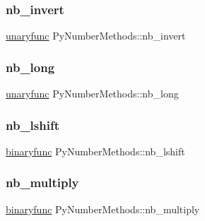 \mbox{\label{struct_py_number_methods_aee32a87f659df88aab41f1f163a106dd}} 
\subsubsection{\texorpdfstring{nb\_invert}{nb\_invert}}
{\footnotesize\ttfamily \mbox{\hyperlink{_python27_2object_8h_aeda2d77a292fdf2c686151d24b3dbf5a}{unaryfunc}} Py\+Number\+Methods\+::nb\+\_\+invert}

\mbox{\label{struct_py_number_methods_aef207975e5fba42dbcf543dadba16268}} 
\subsubsection{\texorpdfstring{nb\_long}{nb\_long}}
{\footnotesize\ttfamily \mbox{\hyperlink{_python27_2object_8h_aeda2d77a292fdf2c686151d24b3dbf5a}{unaryfunc}} Py\+Number\+Methods\+::nb\+\_\+long}

\mbox{\label{struct_py_number_methods_a8d70551ecd98629b8bd17609db59ce75}} 
\subsubsection{\texorpdfstring{nb\_lshift}{nb\_lshift}}
{\footnotesize\ttfamily \mbox{\hyperlink{_python27_2object_8h_a1a50b2d154f36acb9d215f2cdc1561a8}{binaryfunc}} Py\+Number\+Methods\+::nb\+\_\+lshift}

\mbox{\label{struct_py_number_methods_a6c2361df75359a95de536c0bba3b0ebc}} 
\subsubsection{\texorpdfstring{nb\_multiply}{nb\_multiply}}
{\footnotesize\ttfamily \mbox{\hyperlink{_python27_2object_8h_a1a50b2d154f36acb9d215f2cdc1561a8}{binaryfunc}} Py\+Number\+Methods\+::nb\+\_\+multiply}

